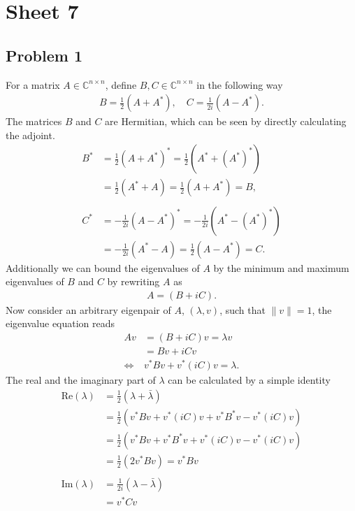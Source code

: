 


\maketitle
\tableofcontents
\section{Sheet 7}
\subsection{Problem 1}
For a matrix $A \in \mathbb{C}^{n\times n}$, define $B, C \in
\mathbb{C}^{n\times n}$ in the following way
\begin{align}
    B = \frac{1}{2}(A + A^*), \quad C = \frac{1}{2i} (A - A^*).
\end{align}
The matrices $B$ and $C$ are Hermitian, which can be seen by directly
calculating the adjoint.
\begin{align}
    B^* &= \frac{1}{2}(A+A^*)^* = \frac{1}{2}\left( A^* + (A^*)^*\right)\\
        &= \frac{1}{2}(A^* + A) = \frac{1}{2}(A+A^*) = B,\\
        \nonumber\\
    C^* &= -\frac{1}{2i}(A-A^*)^* = -\frac{1}{2i}\left( A^* - (A^*)^*\right)\\
        &= -\frac{1}{2i}(A^* - A) = \frac{1}{2}(A -A^*) = C.
\end{align}
Additionally we can bound the eigenvalues of $A$ by the minimum and maximum
eigenvalues of $B$ and $C$ by rewriting $A$ as
\begin{align}
    A = (B + iC).
\end{align}
Now consider an arbitrary eigenpair of $A$, $(\lambda, v)$, such that $\|v\|
= 1$, the eigenvalue equation reads
\begin{align}
    Av &= (B + iC)v = \lambda v\\
        &= Bv + iCv\\
    \Leftrightarrow & v^* B v + v^*(iC)v = \lambda.
\end{align}
The real and the imaginary part of $\lambda$ can be calculated by a simple
identity
\begin{align}
    \text{Re}(\lambda)
    &=  \frac{1}{2}(\lambda + \bar{\lambda}) \\
    &= \frac{1}{2}(v^* B v + v^*(iC)v + v^*B^*v - v^* (i C)v)\\
    &= \frac{1}{2} ( v^*Bv + v^*B^*v + v^* (iC)v - v^*(iC)v)\\
    &= \frac{1}{2}(2v^* B v) = v^*Bv\\
    \nonumber\\
    \text{Im}(\lambda)
    &=  \frac{1}{2i}(\lambda - \bar{\lambda}) \\
    &= v^*Cv
\end{align}
